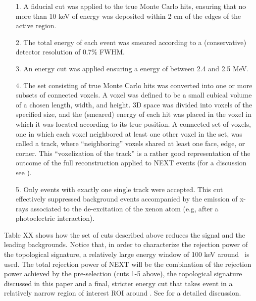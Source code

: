 \documentclass[a4paper,11pt]{article}
\begin{document}
\begin{enumerate}
	\item[1.] A fiducial cut was applied to the true Monte Carlo hits, ensuring that no more than 10 keV of energy was deposited within 2 cm of the edges of the active region.
	\item[2.] The total energy of each event was smeared according to a (conservative) detector resolution of 0.7\% FWHM.
	\item[3.] An energy cut was applied ensuring a energy of between 2.4 and 2.5 MeV. %
	\item[4.] The set consisting of true Monte Carlo hits was converted into one or more subsets of connected voxels.  A voxel was defined to be a small cubical volume of a chosen 
	length, width, and height.  3D space was divided into voxels of the specified size, and the (smeared) energy of each hit was placed in the voxel in which it was located according to its
	true position.  A connected set of voxels, one in which each voxel neighbored at least one other voxel in the set, was called a track, where ``neighboring'' voxels shared at least one face, edge,
	or corner. This ``voxelization of the track'' is a rather good representation of the outcome of the full reconstruction applied to NEXT events (for a discussion see \cite{NEXT_topology}). 
	\item[5.] Only events with exactly one single track were accepted.  This cut effectively suppressed background events accompanied by the emission of x-rays associated to the de-excitation of the xenon atom (e.g, after a photoelectric interaction). 
	\end{enumerate}

Table XX shows how the set of cuts described above reduces the signal and the leading backgrounds.  Notice that, in order to characterize the rejection power of the topological signature, a relatively large energy window of 100 keV around \Qbb\ is used. The total rejection power of NEXT will be the combination of the rejection power achieved by the pre-selection (cuts 1-5 above), the topological signature discussed in this paper and a final, stricter energy cut that takes event in a relatively narrow region of interest ROI around \Qbb. See \cite{Martin-Albo:2015rhw} for a detailed discussion.
\end{document}
